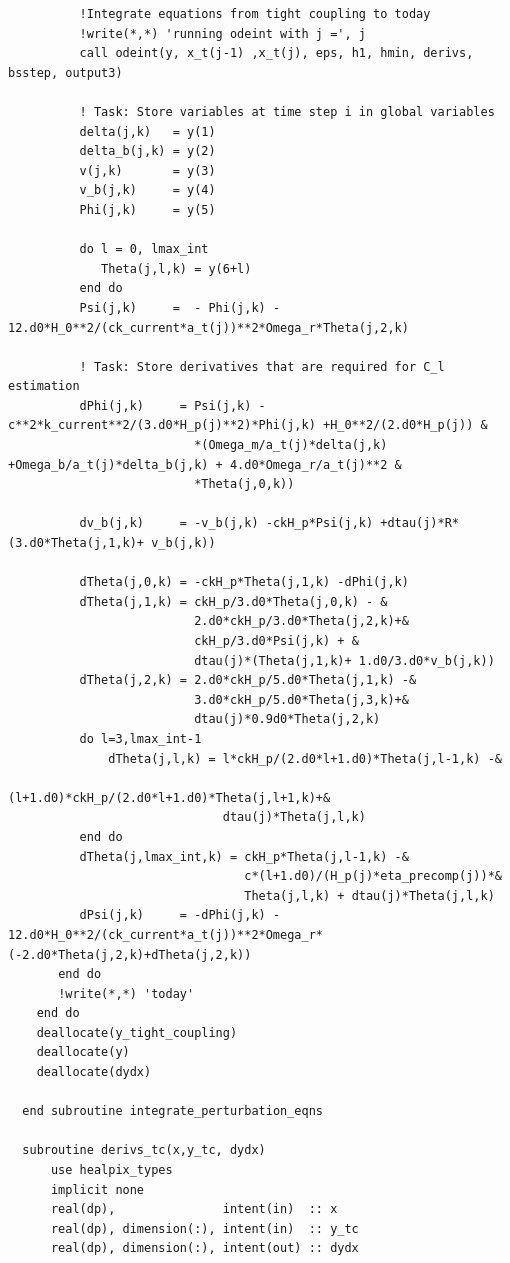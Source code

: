\documentclass[a4paper]{report}
\begin{document}
\begin{verbatim}
          !Integrate equations from tight coupling to today
          !write(*,*) 'running odeint with j =', j
          call odeint(y, x_t(j-1) ,x_t(j), eps, h1, hmin, derivs, bsstep, output3)

          ! Task: Store variables at time step i in global variables
          delta(j,k)   = y(1)
          delta_b(j,k) = y(2)
          v(j,k)       = y(3)
          v_b(j,k)     = y(4)
          Phi(j,k)     = y(5)
          
          do l = 0, lmax_int
             Theta(j,l,k) = y(6+l)
          end do
          Psi(j,k)     =  - Phi(j,k) - 12.d0*H_0**2/(ck_current*a_t(j))**2*Omega_r*Theta(j,2,k)

          ! Task: Store derivatives that are required for C_l estimation
          dPhi(j,k)     = Psi(j,k) -c**2*k_current**2/(3.d0*H_p(j)**2)*Phi(j,k) +H_0**2/(2.d0*H_p(j)) &
                          *(Omega_m/a_t(j)*delta(j,k) +Omega_b/a_t(j)*delta_b(j,k) + 4.d0*Omega_r/a_t(j)**2 &
                          *Theta(j,0,k))

          dv_b(j,k)     = -v_b(j,k) -ckH_p*Psi(j,k) +dtau(j)*R*(3.d0*Theta(j,1,k)+ v_b(j,k))

          dTheta(j,0,k) = -ckH_p*Theta(j,1,k) -dPhi(j,k)
          dTheta(j,1,k) = ckH_p/3.d0*Theta(j,0,k) - &
                          2.d0*ckH_p/3.d0*Theta(j,2,k)+&
                          ckH_p/3.d0*Psi(j,k) + &
                          dtau(j)*(Theta(j,1,k)+ 1.d0/3.d0*v_b(j,k))
          dTheta(j,2,k) = 2.d0*ckH_p/5.d0*Theta(j,1,k) -&
                          3.d0*ckH_p/5.d0*Theta(j,3,k)+&
                          dtau(j)*0.9d0*Theta(j,2,k)
          do l=3,lmax_int-1
              dTheta(j,l,k) = l*ckH_p/(2.d0*l+1.d0)*Theta(j,l-1,k) -&
                              (l+1.d0)*ckH_p/(2.d0*l+1.d0)*Theta(j,l+1,k)+&
                              dtau(j)*Theta(j,l,k)
          end do
          dTheta(j,lmax_int,k) = ckH_p*Theta(j,l-1,k) -&
                                 c*(l+1.d0)/(H_p(j)*eta_precomp(j))*&
                                 Theta(j,l,k) + dtau(j)*Theta(j,l,k)
          dPsi(j,k)     = -dPhi(j,k) - 12.d0*H_0**2/(ck_current*a_t(j))**2*Omega_r*(-2.d0*Theta(j,2,k)+dTheta(j,2,k))
       end do
       !write(*,*) 'today'
    end do
    deallocate(y_tight_coupling)
    deallocate(y)
    deallocate(dydx)

  end subroutine integrate_perturbation_eqns

  subroutine derivs_tc(x,y_tc, dydx)
      use healpix_types
      implicit none
      real(dp),               intent(in)  :: x
      real(dp), dimension(:), intent(in)  :: y_tc
      real(dp), dimension(:), intent(out) :: dydx


\end{verbatim}
\end{document}
